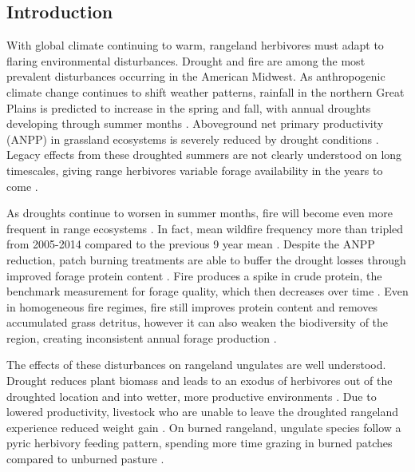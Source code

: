 \documentclass[referee, 
	            sn-basic]
           {sn-jnl}
\begin{document}
\maketitle
\begin{linenumbers}

\section{Introduction}

With global climate continuing to warm, rangeland herbivores must adapt
to flaring environmental disturbances. Drought and fire are among the
most prevalent disturbances occurring in the American Midwest. As
anthropogenic climate change continues to shift weather patterns,
rainfall in the northern Great Plains is predicted to increase in the
spring and fall, with annual droughts developing through summer months
\citep{derner2018}. Aboveground net primary productivity (ANPP) in
grassland ecosystems is severely reduced by drought conditions
\citep{hoover2014}. Legacy effects from these droughted summers are not
clearly understood on long timescales, giving range herbivores variable
forage availability in the years to come \citep{hoover2014}.

As droughts continue to worsen in summer months, fire will become even
more frequent in range ecosystems \citep{donovan2017, donovan2020}. In
fact, mean wildfire frequency more than tripled from 2005-2014 compared
to the previous 9 year mean \citep{donovan2017}. Despite the ANPP
reduction, patch burning treatments are able to buffer the drought
losses through improved forage protein content \citep{spiess2020}. Fire
produces a spike in crude protein, the benchmark measurement for forage
quality, which then decreases over time \citep{allred2011}. Even in
homogeneous fire regimes, fire still improves protein content and
removes accumulated grass detritus, however it can also weaken the
biodiversity of the region, creating inconsistent annual forage
production \citep{mcgranahan2016}.

The effects of these disturbances on rangeland ungulates are well
understood. Drought reduces plant biomass and leads to an exodus of
herbivores out of the droughted location and into wetter, more
productive environments \citep{trisos2021}. Due to lowered productivity,
livestock who are unable to leave the droughted rangeland experience
reduced weight gain \citep{allred2014}. On burned rangeland, ungulate
species follow a pyric herbivory feeding pattern, spending more time
grazing in burned patches compared to unburned pasture
\citep{fuhlendorf2009, parrini2010}.


\end{linenumbers}
\end{document}
